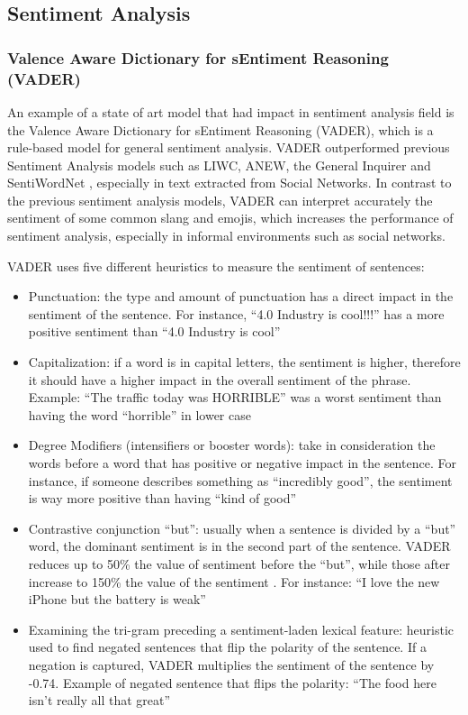 \documentclass[runningheads]{llncs}
\begin{document}
\subsection{Sentiment Analysis}

\subsubsection{Valence Aware Dictionary for sEntiment Reasoning (VADER)}

An example of a state of art model that had impact in sentiment analysis field is the Valence Aware Dictionary for sEntiment Reasoning (VADER), which is a rule-based model for general sentiment analysis. VADER outperformed previous Sentiment Analysis models such as LIWC, ANEW, the General Inquirer and SentiWordNet \cite{Hutto_Gilbert_2014}, especially in text extracted from Social Networks. In contrast to the previous sentiment analysis models, VADER can interpret accurately the sentiment of some common slang and emojis, which increases the performance of sentiment analysis, especially in informal environments such as social networks. 

VADER uses five different heuristics to measure the sentiment of sentences: 

\begin{itemize}
	\item Punctuation: the type and amount of punctuation has a direct impact in the sentiment of the sentence. For instance, “4.0 Industry is cool!!!” has a more positive sentiment than “4.0 Industry is cool” 
	\item Capitalization: if a word is in capital letters, the sentiment is higher, therefore it should have a higher impact in the overall sentiment of the phrase. Example: “The traffic today was HORRIBLE” was a worst sentiment than having the word “horrible” in lower case 
	\item Degree Modifiers (intensifiers or booster words): take in consideration the words before a word that has positive or negative impact in the sentence. For instance, if someone describes something as “incredibly good”, the sentiment is way more positive than having “kind of good”
	\item Contrastive conjunction “but”: usually when a sentence is divided by a “but” word, the dominant sentiment is in the second part of the sentence. VADER reduces up to 50\% the value of sentiment before the “but”, while those after increase to 150\% the value of the sentiment \cite{Calderon_2018}. For instance: “I love the new iPhone but the battery is weak” 
	\item Examining the tri-gram preceding a sentiment-laden lexical feature: heuristic used to find negated sentences that flip the polarity of the sentence. If a negation is captured, VADER multiplies the sentiment of the sentence by -0.74. Example of negated sentence that flips the polarity: “The food here isn’t really all that great” \cite{Hutto_Gilbert_2014}
\end{itemize}
 
\end{document}
